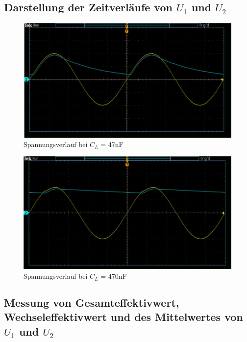 \documentclass{article}
\begin{document}
\subsection{Darstellung der Zeitverläufe von $U_1$ und $U_2$}

\begin{figure}[h]
  \begin{center}
    \includegraphics[scale=0.6]{../assets/images/EL1P2/aufgabe 3 47n.JPG}
    \caption{Spannungsverlauf bei $C_L$ = 47nF}
  \end{center}
\end{figure}

\begin{figure}[h]
  \begin{center}
    \includegraphics[scale=0.6]{../assets/images/EL1P2/aufgabe 3 470n.JPG}
    \caption{Spannungsverlauf bei $C_L$ = 470nF}
  \end{center}
\end{figure}

\newpage

\subsection{Messung von Gesamteffektivwert, Wechseleffektivwert und des Mittelwertes von $U_1$ und $U_2$}
\end{document}
